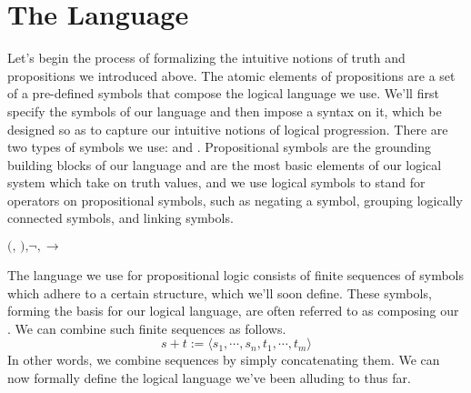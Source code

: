 \documentclass{article}
\begin{document}
\section{The Language}
Let's begin the process of formalizing the intuitive notions of truth and propositions we introduced above. The atomic elements of propositions are a set of a pre-defined symbols that compose the logical language we use. We'll first specify the symbols of our language and then impose a syntax on it, which be designed so as to capture our intuitive notions of logical progression. There are two types of symbols we use:  and . Propositional symbols are the grounding building blocks of our language and are the most basic elements of our logical system which take on truth values, and we use logical symbols to stand for operators on propositional symbols, such as negating a symbol, grouping logically connected symbols, and linking symbols.
\begin{center}
    $ \text{(, ),} \neg, \rightarrow $
\end{center}
The language we use for propositional logic consists of finite sequences of symbols which adhere to a certain structure, which we'll soon define. These symbols, forming the basis for our logical language, are often referred to as composing our . We can combine such finite sequences as follows.
    $$ s + t := \langle s_1, \cdots, s_n, t_1, \cdots, t_m \rangle $$
\n
In other words, we combine sequences by simply concatenating them. We can now formally define the logical language we've been alluding to thus far.
\end{document}
